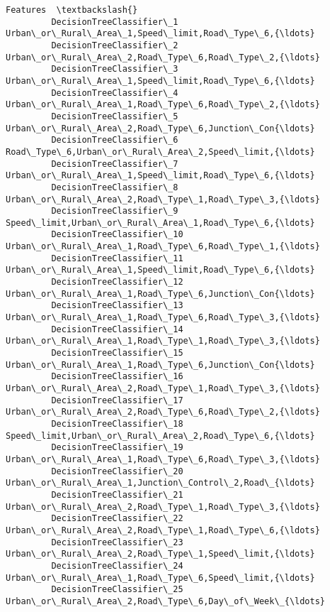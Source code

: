 \documentclass[11pt]{article}
\begin{document}
\begin{Verbatim}[commandchars=\\\{\}]
                                                                              Features  \textbackslash{}
         DecisionTreeClassifier\_1    Urban\_or\_Rural\_Area\_1,Speed\_limit,Road\_Type\_6,{\ldots}   
         DecisionTreeClassifier\_2    Urban\_or\_Rural\_Area\_2,Road\_Type\_6,Road\_Type\_2,{\ldots}   
         DecisionTreeClassifier\_3    Urban\_or\_Rural\_Area\_1,Speed\_limit,Road\_Type\_6,{\ldots}   
         DecisionTreeClassifier\_4    Urban\_or\_Rural\_Area\_1,Road\_Type\_6,Road\_Type\_2,{\ldots}   
         DecisionTreeClassifier\_5    Urban\_or\_Rural\_Area\_2,Road\_Type\_6,Junction\_Con{\ldots}   
         DecisionTreeClassifier\_6    Road\_Type\_6,Urban\_or\_Rural\_Area\_2,Speed\_limit,{\ldots}   
         DecisionTreeClassifier\_7    Urban\_or\_Rural\_Area\_1,Speed\_limit,Road\_Type\_6,{\ldots}   
         DecisionTreeClassifier\_8    Urban\_or\_Rural\_Area\_2,Road\_Type\_1,Road\_Type\_3,{\ldots}   
         DecisionTreeClassifier\_9    Speed\_limit,Urban\_or\_Rural\_Area\_1,Road\_Type\_6,{\ldots}   
         DecisionTreeClassifier\_10   Urban\_or\_Rural\_Area\_1,Road\_Type\_6,Road\_Type\_1,{\ldots}   
         DecisionTreeClassifier\_11   Urban\_or\_Rural\_Area\_1,Speed\_limit,Road\_Type\_6,{\ldots}   
         DecisionTreeClassifier\_12   Urban\_or\_Rural\_Area\_1,Road\_Type\_6,Junction\_Con{\ldots}   
         DecisionTreeClassifier\_13   Urban\_or\_Rural\_Area\_1,Road\_Type\_6,Road\_Type\_3,{\ldots}   
         DecisionTreeClassifier\_14   Urban\_or\_Rural\_Area\_1,Road\_Type\_1,Road\_Type\_3,{\ldots}   
         DecisionTreeClassifier\_15   Urban\_or\_Rural\_Area\_1,Road\_Type\_6,Junction\_Con{\ldots}   
         DecisionTreeClassifier\_16   Urban\_or\_Rural\_Area\_2,Road\_Type\_1,Road\_Type\_3,{\ldots}   
         DecisionTreeClassifier\_17   Urban\_or\_Rural\_Area\_2,Road\_Type\_6,Road\_Type\_2,{\ldots}   
         DecisionTreeClassifier\_18   Speed\_limit,Urban\_or\_Rural\_Area\_2,Road\_Type\_6,{\ldots}   
         DecisionTreeClassifier\_19   Urban\_or\_Rural\_Area\_1,Road\_Type\_6,Road\_Type\_3,{\ldots}   
         DecisionTreeClassifier\_20   Urban\_or\_Rural\_Area\_1,Junction\_Control\_2,Road\_{\ldots}   
         DecisionTreeClassifier\_21   Urban\_or\_Rural\_Area\_2,Road\_Type\_1,Road\_Type\_3,{\ldots}   
         DecisionTreeClassifier\_22   Urban\_or\_Rural\_Area\_2,Road\_Type\_1,Road\_Type\_6,{\ldots}   
         DecisionTreeClassifier\_23   Urban\_or\_Rural\_Area\_2,Road\_Type\_1,Speed\_limit,{\ldots}   
         DecisionTreeClassifier\_24   Urban\_or\_Rural\_Area\_1,Road\_Type\_6,Speed\_limit,{\ldots}   
         DecisionTreeClassifier\_25   Urban\_or\_Rural\_Area\_2,Road\_Type\_6,Day\_of\_Week\_{\ldots}   

\end{Verbatim}
\end{document}
